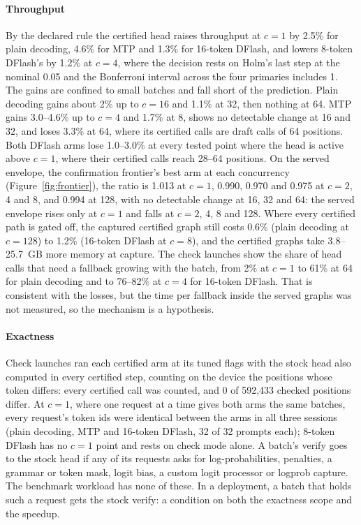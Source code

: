 \paragraph{Throughput} By the declared rule the certified head raises throughput at $c=1$ by 2.5\% for plain decoding, 4.6\% for MTP and 1.3\% for 16-token DFlash, and lowers 8-token DFlash's by 1.2\% at $c=4$, where the decision rests on Holm's last step at the nominal 0.05 and the Bonferroni interval across the four primaries includes 1. The gains are confined to small batches and fall short of the prediction. Plain decoding gains about 2\% up to $c=16$ and 1.1\% at 32, then nothing at 64. MTP gains 3.0--4.6\% up to $c=4$ and 1.7\% at 8, shows no detectable change at 16 and 32, and loses 3.3\% at 64, where its certified calls are draft calls of 64 positions. Both DFlash arms lose 1.0--3.0\% at every tested point where the head is active above $c=1$, where their certified calls reach 28--64 positions. On the served envelope, the confirmation frontier's best arm at each concurrency (Figure~\ref{fig:frontier}), the ratio is 1.013 at $c=1$, 0.990, 0.970 and 0.975 at $c=2$, 4 and 8, and 0.994 at 128, with no detectable change at 16, 32 and 64: the served envelope rises only at $c=1$ and falls at $c=2$, 4, 8 and 128. Where every certified path is gated off, the captured certified graph still costs 0.6\% (plain decoding at $c=128$) to 1.2\% (16-token DFlash at $c=8$), and the certified graphs take 3.8--25.7~GB more memory at capture. The check launches show the share of head calls that need a fallback growing with the batch, from 2\% at $c=1$ to 61\% at 64 for plain decoding and to 76--82\% at $c=4$ for 16-token DFlash. That is consistent with the losses, but the time per fallback inside the served graphs was not measured, so the mechanism is a hypothesis.

\paragraph{Exactness} Check launches ran each certified arm at its tuned flags with the stock head also computed in every certified step, counting on the device the positions whose token differs: every certified call was counted, and 0 of 592,433 checked positions differ. At $c=1$, where one request at a time gives both arms the same batches, every request's token ids were identical between the arms in all three sessions (plain decoding, MTP and 16-token DFlash, 32 of 32 prompts each); 8-token DFlash has no $c=1$ point and rests on check mode alone. A batch's verify goes to the stock head if any of its requests asks for log-probabilities, penalties, a grammar or token mask, logit bias, a custom logit processor or logprob capture. The benchmark workload has none of these. In a deployment, a batch that holds such a request gets the stock verify: a condition on both the exactness scope and the speedup.

